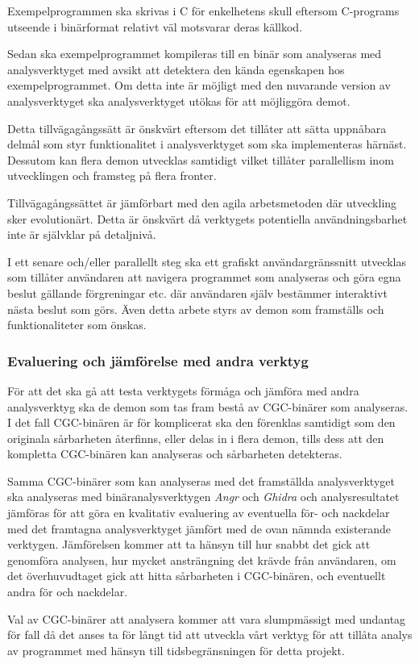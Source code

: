 Exempelprogrammen ska skrivas i C för enkelhetens skull eftersom C-programs
utseende i binärformat relativt väl motsvarar deras källkod. 

Sedan ska exempelprogrammet kompileras till en binär som analyseras med
analysverktyget med avsikt att detektera den kända egenskapen hos
exempelprogrammet. Om detta inte är möjligt med den nuvarande version av
analysverktyget ska analysverktyget utökas för att möjliggöra demot.

Detta tillvägagångssätt är önskvärt eftersom det tillåter att sätta uppnåbara
delmål som styr funktionalitet i analysverktyget som ska implementeras härnäst.
Dessutom kan flera demon utvecklas samtidigt vilket tillåter parallellism inom
utvecklingen och framsteg på flera fronter.

Tillvägagångssättet är jämförbart med den agila arbetsmetoden där utveckling sker 
evolutionärt. Detta är önskvärt då verktygets potentiella 
användningsbarhet inte är självklar på detaljnivå.

I ett senare och/eller parallellt steg ska ett grafiskt användargränssnitt
utvecklas som tillåter användaren att navigera programmet som analyseras och
göra egna beslut gällande förgreningar etc. där användaren själv bestämmer
interaktivt nästa beslut som görs. Även detta arbete styrs av demon som
framställs och funktionaliteter som önskas.

\subsubsection{Evaluering och jämförelse med andra verktyg}

För att det ska gå att testa verktygets förmåga och jämföra med andra
analysverktyg ska de demon som tas fram bestå av CGC-binärer som analyseras. I
det fall CGC-binären är för komplicerat ska den förenklas samtidigt som den
originala sårbarheten återfinns, eller delas in i flera demon, tills dess att
den kompletta CGC-binären kan analyseras och sårbarheten detekteras.

Samma CGC-binärer som kan analyseras med det framställda analysverktyget ska
analyseras med binäranalysverktygen \emph{Angr} och \emph{Ghidra} och
analysresultatet jämföras för att göra en kvalitativ evaluering av eventuella
för- och nackdelar med det framtagna analysverktyget jämfört med de ovan nämnda
existerande verktygen. Jämförelsen kommer att ta hänsyn till hur snabbt det
gick att genomföra analysen, hur mycket ansträngning det krävde från
användaren, om det överhuvudtaget gick att hitta sårbarheten i CGC-binären, och
eventuellt andra för och nackdelar.

Val av CGC-binärer att analysera kommer att vara slumpmässigt med undantag för
fall då det anses ta för långt tid att utveckla vårt verktyg för att tillåta
analys av programmet med hänsyn till tidsbegränsningen för detta projekt.
